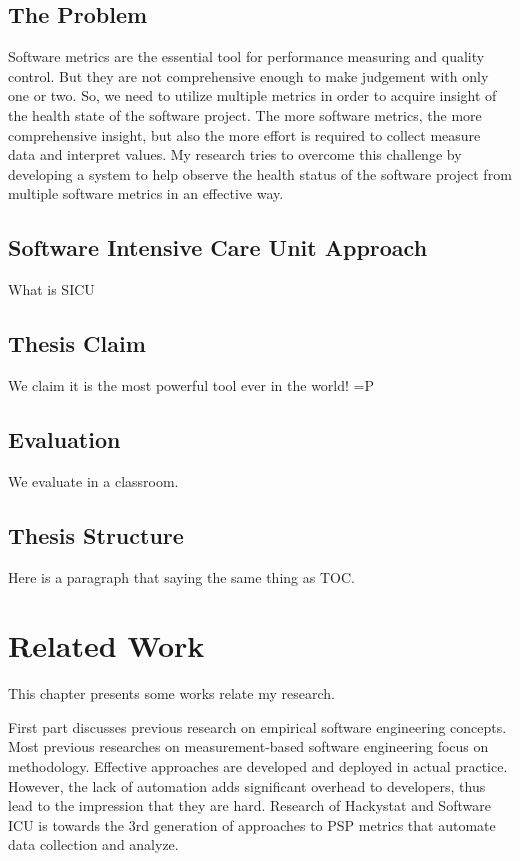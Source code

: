 \section{The Problem}
Software metrics are the essential tool for performance measuring and quality control. But they are not comprehensive enough to make judgement with only one or two. So, we need to utilize multiple metrics in order to acquire insight of the health state of the software project. The more software metrics, the more comprehensive insight, but also the more effort is required to collect measure data and interpret values. My research tries to overcome this challenge by developing a system to help observe the health status of the software project from multiple software metrics in an effective way.

\section{Software Intensive Care Unit Approach}
What is SICU

\section{Thesis Claim}
We claim it is the most powerful tool ever in the world! =P

\section{Evaluation}
We evaluate in a classroom.

\section{Thesis Structure}
Here is a paragraph that saying the same thing as TOC.

\chapter{Related Work}
This chapter presents some works relate my research.

First part discusses previous research on empirical software engineering concepts. Most previous researches on measurement-based software engineering focus on methodology. Effective approaches are developed and deployed in actual practice. However, the lack of automation adds significant overhead to developers, thus lead to the impression that they are hard. Research of Hackystat and Software ICU is towards the 3rd generation of approaches to PSP metrics that automate data collection and analyze\cite{csdl2-02-07}.

